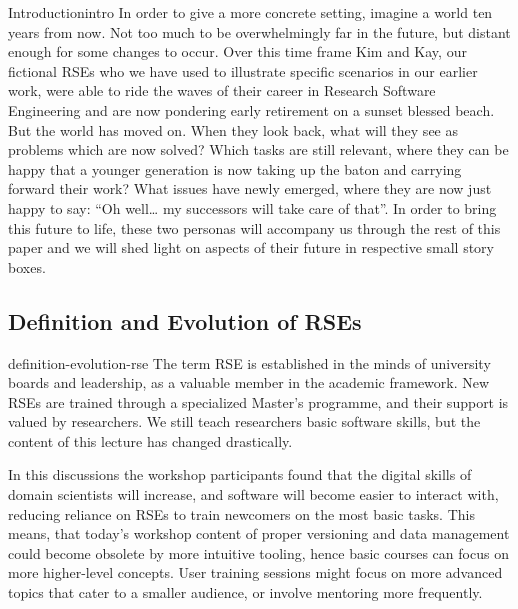 \documentclass{eceasst}
\begin{document}
\begin{story}{Introduction}{intro}
In order to give a more concrete setting, imagine a world ten years from now.
Not too much to be overwhelmingly far in the future, but distant enough for some changes to occur.
Over this time frame Kim\cite{Anzt2021} and Kay\cite{Goth2024},
our fictional RSEs who we have used to illustrate specific scenarios in our earlier work,
were able to ride the waves of their career in Research Software Engineering and are now pondering early retirement on a sunset blessed beach.
But the world has moved on.
When they look back, what will they see as problems which are now solved?
Which tasks are still relevant, where they can be happy that a younger generation is now taking up the baton and carrying forward their work?
What issues have newly emerged, where they are now just happy to say: “Oh well… my successors will take care of that”.
In order to bring this future to life, these two personas will accompany us through the rest of this paper and we will shed light on aspects
of their future in respective small story boxes.
 \end{story}


\subsection{Definition and Evolution of RSEs}
\begin{whatis}{}{definition-evolution-rse}
The term RSE is established in the minds of university boards and leadership, as a valuable member in the academic framework.
New RSEs are trained through a specialized Master's programme, and their support is valued by researchers. We still teach researchers basic software skills, but the content of this lecture has changed drastically.
\end{whatis}
In this discussions the workshop participants found that
the digital skills of domain scientists will increase,
and software will become easier to interact with,
reducing reliance on RSEs to train newcomers on the most basic tasks.
This means, that today's workshop content of proper versioning and data management could become obsolete
by more intuitive tooling, hence basic courses can focus on more higher-level concepts.
User training sessions might focus on more advanced topics
that cater to a smaller audience, or involve mentoring more frequently.
\end{document}
